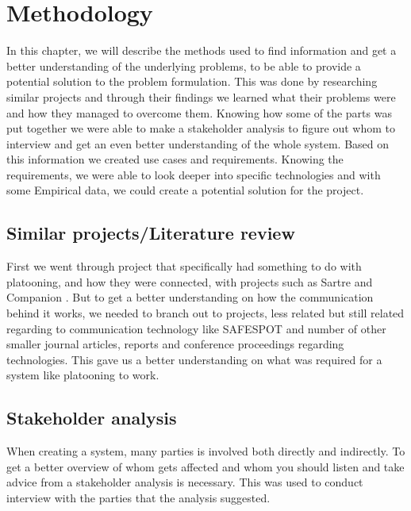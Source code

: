 \section{Methodology}\label{sec:methodology}
% 
In this chapter, we will describe the methods used to find information and get a better understanding of the underlying problems, to be able to provide a potential solution to the problem formulation. This was done by researching similar projects and through their findings we learned what their problems were and how they managed to overcome them. Knowing how some of the parts was put together we were able to make a stakeholder analysis to figure out whom to interview and get an even better understanding of the whole system. Based on this information we created use cases and requirements. Knowing the requirements, we were able to look deeper into specific technologies and with some Empirical data, we could create a potential solution for the project. 
% 
\subsection{Similar projects/Literature review}
First we went through project that specifically had something to do with platooning, and how they were connected, with projects such as Sartre \cite{Chan2012ProjectSARTRE} and Companion \cite{2016CompanionProject}. But to get a better understanding on how the communication behind it works, we needed to branch out to projects, less related but still related regarding to communication technology like SAFESPOT \cite{Safespot} and number of other smaller journal articles, reports and conference proceedings regarding technologies. This gave us a better understanding on what was required for a system like platooning to work.
% 
\subsection{Stakeholder analysis}
When creating a system, many parties is involved both directly and indirectly. To get a better overview of whom gets affected and whom you should listen and take advice from a stakeholder analysis is necessary. This was used to conduct interview with the parties that the analysis suggested. 
% 
